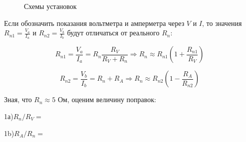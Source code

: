 \documentclass[14pt]{article}
\begin{document}
	\newpage
	\vspace*{2cm}
	\begin{figure}[h!]
		\caption{Схемы установок}
		\label{fig:image}
	\end{figure}
	
	\newpage
	
	Если обозначить показания вольтметра и амперметра через $V$ и $I$, то значения $R_{n1} = \frac{V_a}{I_a}$ и $R_{n2} = \frac{V_b}		{I_b}$ будут отличаться от реального $R_n$:
	
	$$R_{n1} = \frac{V_a}{I_a} = R_n\frac{R_V}{R_V + R_n} \Rightarrow R_n \approx R_{n1}\left( 1 + \frac{R_{n1}}{R_V} \right)$$
	
	$$R_{n2} = \frac{V_b}{I_b} = R_n + R_A \Rightarrow R_n \approx R_{n2} \left(1 - \frac{R_A}{R_{n2}}\right)$$

	Зная, что $R_n \approx 5$ Ом, оценим величину поправок:

	1а)\hspace{0.5cm}$R_n/R_V = $
	
	1b)\hspace{0.5cm}$R_A/R_n = $
	
\end{document}
